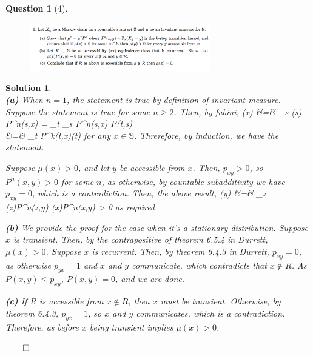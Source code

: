 \documentclass{article} %
\def\eQb#1\eQe{\begin{eqnarray*}#1\end{eqnarray*}}
\theoremstyle{quest}
\newtheorem*{question}{Question}
\newtheorem*{solution}{Solution}
\begin{document}
\begin{question}[4]
\hfill
\begin{figure}[h!]
  \centering
    \includegraphics[width=0.7\textwidth]{prob-e11-p4.png}
\end{figure}
\end{question}
\begin{solution} \hfill \\
\textbf{(a)} When $n = 1$, the statement is true by definition of invariant
measure. Suppose the statement is true for some $n \geq 2$. Then, by fubini,
\eQb
\mu(x) &=& \sum_{s \in {}} \mu(s) P^{n}(s,x) 
= \sum_{t \in {}}\sum_{s \in {}} P^{n}(s,x) P(t,s) \\
&=& \sum_{t \in {}} P^{k}(t,x)\mu(t) 
\eQe 
for any $x \in \mathbb{S}$. Threrefore, by induction, we have the statement.

\smallskip

Suppose $\mu(x) > 0$, and let $y$ be accessible from $x$. Then, 
$p_{xy} > 0$, so $P^{n}(x,y) > 0$ for some $n$, as otherwise, by countable
subadditivity we have $p_{xy} = 0$, which is a contradiction.
Then, the above result,
\eQb
\mu(y) &=& \sum_{z \in {}} \mu(z)P^{n}(z,y) \geq \mu(x)P^{n}(x,y) > 0 
\eQe
as required.

\bigskip

\textbf{(b)} We provide the proof for the case when it's a stationary distribution.
Suppose $x$ is transient. Then, by the contrapositive of theorem 6.5.4 in Durrett,
$\mu(x) > 0$. Suppose $x$ is recurrent. Then, by theorem 6.4.3 in Durrett,
$p_{xy} = 0$, as otherwise $p_{yx} = 1$ and $x$ and $y$ communicate, which 
contradicts that $x \not\in R$. As $P(x,y) \leq p_{xy}$, $P(x,y) = 0$, and 
we are done. 

\bigskip

\textbf{(c)} If $R$ is accessible from $x \not\in R$, then $x$ must be transient.
Otherwise, by theorem 6.4.3, $p_{yx} = 1$, so $x$ and $y$ communicates, which 
is a contradiction. Therefore, as before $x$ being transient implies $\mu(x) > 0$. 

\hfill $\qed$

\end{solution}
\end{document}
